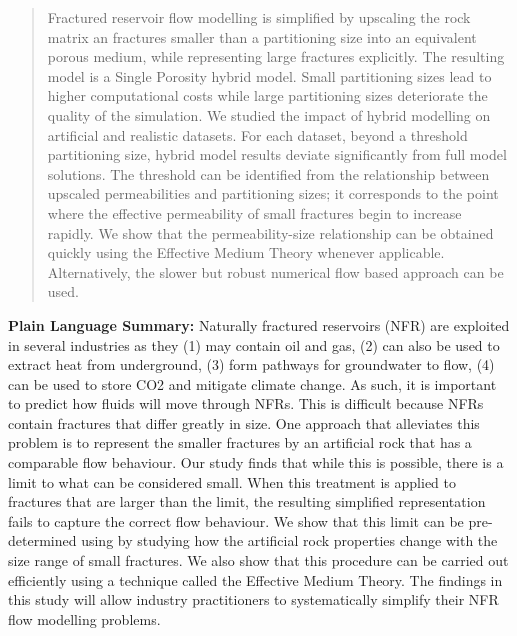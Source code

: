 \documentclass[draft]{agujournal2018}
\begin{document}
\begin{abstract}
Fractured reservoir flow modelling is simplified by upscaling the rock matrix an fractures smaller than a partitioning size into an equivalent porous medium, while representing large fractures explicitly. The resulting model is a Single Porosity hybrid model. Small partitioning sizes lead to higher computational costs while large partitioning sizes deteriorate the quality of the simulation. We studied the impact of hybrid modelling on artificial and realistic datasets. For each dataset, beyond a threshold partitioning size, hybrid model results deviate significantly from full model solutions. The threshold can be identified from the relationship between upscaled permeabilities and partitioning sizes; it corresponds to the point where the effective permeability of small fractures begin to increase rapidly. We show that the permeability-size relationship can be obtained quickly using the Effective Medium Theory whenever applicable. Alternatively, the slower but robust numerical flow based approach can be used.

\end{abstract}

\textbf{Plain Language Summary:} Naturally fractured reservoirs (NFR) are exploited in several industries as they (1) may contain oil and gas, (2) can also be used to extract heat from underground, (3) form pathways for groundwater to flow, (4) can be used to store CO2 and mitigate climate change. As such, it is important to predict how fluids will move through NFRs. This is difficult because NFRs contain fractures that differ greatly in size. One approach that alleviates this problem is to represent the smaller fractures by an artificial rock that has a comparable flow behaviour. Our study finds that while this is possible, there is a limit to what can be considered small. When this treatment is applied to fractures that are larger than the limit, the resulting simplified representation fails to capture the correct flow behaviour. We show that this limit can be pre-determined using by studying how the artificial rock properties change with the size range of small fractures. We also show that this procedure can be carried out efficiently using a technique called the Effective Medium Theory. The findings in this study will allow industry practitioners to systematically simplify their NFR flow modelling problems.



%
%
\end{document}
